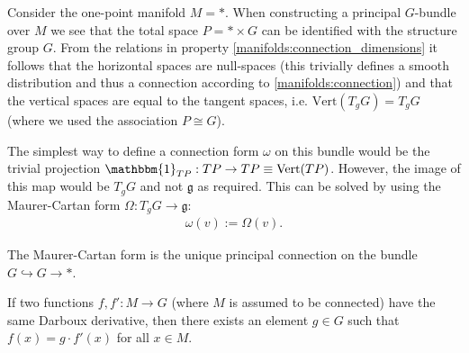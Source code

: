     \begin{construct}
        Consider the one-point manifold $M=\ast$. When constructing a principal $G$-bundle over $M$ we see that the total space $P=\ast\times G$ can be identified with the structure group $G$. From the relations in property \ref{manifolds:connection_dimensions} it follows that the horizontal spaces are null-spaces (this trivially defines a smooth distribution and thus a connection according to \ref{manifolds:connection}) and that the vertical spaces are equal to the tangent spaces, i.e. $\text{Vert}(T_gG)=T_gG$ (where we used the association $P\cong G$).

        The simplest way to define a connection form $\omega$ on this bundle would be the trivial projection $\mathbbm{1}_{TP}:TP\rightarrow TP\equiv\text{Vert}(TP)$. However, the image of this map would be $T_gG$ and not $\mathfrak{g}$ as required. This can be solved by using the Maurer-Cartan form $\Omega:T_gG\rightarrow\mathfrak{g}$:
        \begin{gather}
            \omega(v) := \Omega(v).
        \end{gather}
    \end{construct}
    \begin{property}
        The Maurer-Cartan form is the unique principal connection on the bundle $G\hookrightarrow G\rightarrow\ast$.
    \end{property}

    \begin{property}
        If two functions $f,f':M\rightarrow G$ (where $M$ is assumed to be connected) have the same Darboux derivative, then there exists an element $g\in G$ such that $f(x)=g\cdot f'(x)$ for all $x\in M$.
    \end{property}

